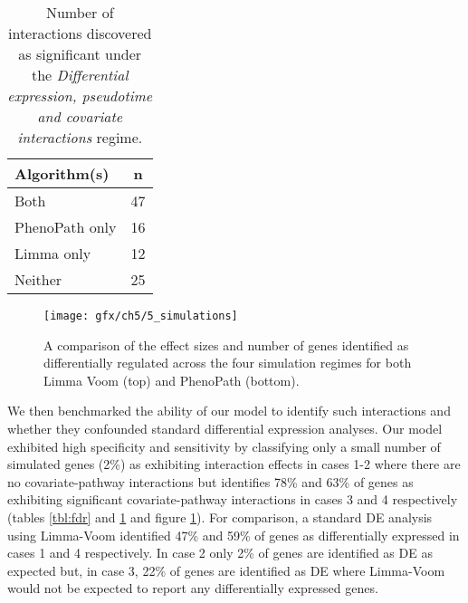 \begin{table}[ht]
\centering
\begin{tabular}{|l | c|}
  \hline
  Algorithm(s) & n \\
  \hline
 Both &  47 \\
   PhenoPath only &  16 \\
   Limma only &  12 \\
   Neither &  25 \\
   \hline
\end{tabular} \caption{Number of interactions discovered as significant under the \emph{Differential expression, pseudotime and covariate interactions} regime.} \label{tbl:nclvm}
\end{table}

\begin{figure}
\centering
  \texttt{[image: gfx/ch5/5\_simulations]}
  \caption{A comparison of the effect sizes and number of genes identified as differentially regulated across the four simulation regimes for both Limma Voom (top) and PhenoPath (bottom). } \label{fig:simulations}
\end{figure}



We then benchmarked the ability of our model to identify such interactions and whether they confounded standard differential expression analyses. Our model exhibited high specificity and sensitivity by classifying only a small number of simulated genes (2\%) as exhibiting interaction effects in cases 1-2 where there are no covariate-pathway interactions but identifies 78\% and 63\% of genes as exhibiting significant covariate-pathway interactions in cases 3 and 4 respectively (tables \ref{tbl:fdr} and \ref{tbl:nclvm} and figure \ref{fig:simulations}). For comparison, a standard DE analysis using Limma-Voom identified 47\% and 59\% of genes as differentially expressed in cases 1 and 4 respectively. In case 2 only 2\% of genes are identified as DE as expected but, in case 3, 22\% of genes are identified as DE where Limma-Voom would not be expected to report any differentially expressed genes.

